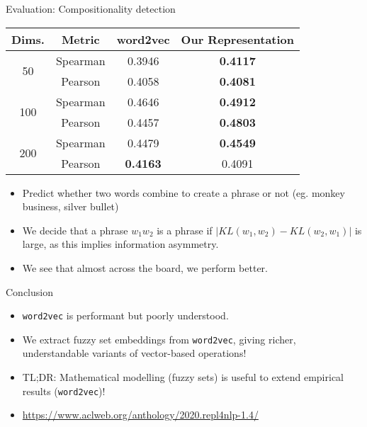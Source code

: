 \documentclass[8pt]{beamer}
\begin{document}
\begin{frame}{Evaluation: Compositionality detection}
    \begin{tabular}{c|c|cc}
        \bf Dims.               & \bf Metric& \bf word2vec  & \bf Our Representation    \\ \hline
        \multirow{2}{*}{50}     & Spearman  & 0.3946    & \bf 0.4117            \\
                                & Pearson   & 0.4058    & \bf 0.4081            \\ \hline
        \multirow{2}{*}{100}    & Spearman  & 0.4646    & \bf 0.4912            \\
                                & Pearson   & 0.4457    & \bf 0.4803            \\ \hline
        \multirow{2}{*}{200}    & Spearman  & 0.4479    & \bf 0.4549            \\
                                & Pearson   & \bf 0.4163& 0.4091                \\
    \end{tabular}
\begin{itemize}
  \item Predict whether two words combine to create a phrase or not (eg. monkey business, silver bullet)
  \item We decide that a phrase $w_1 w_2$ is a phrase if $|KL(w_1, w_2) - KL(w_2, w_1)|$ is large, as this implies information asymmetry.
  \item We see that almost across the board, we perform better.
\end{itemize}
\end{frame}

\begin{frame}{Conclusion}
  \begin{itemize}
    \item \texttt{word2vec} is performant but poorly understood.
    \item We extract fuzzy set embeddings from \texttt{word2vec}, giving richer, understandable variants of vector-based operations!
    \item TL;DR: Mathematical modelling (fuzzy sets) is useful to extend empirical results (\texttt{word2vec})!
    \item \url{https://www.aclweb.org/anthology/2020.repl4nlp-1.4/}
  \end{itemize}
\end{frame}
\end{document}
